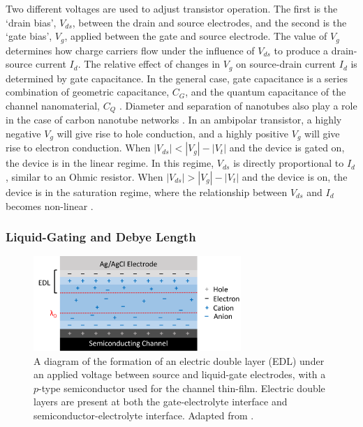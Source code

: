 \documentclass[
  a4paper,
]{scrbook}
\begin{document}
Two different voltages are used to adjust transistor operation. The
first is the `drain bias', \(V_{ds}\), between the drain and source
electrodes, and the second is the `gate bias', \(V_g\), applied between
the gate and source electrode. The value of \(V_g\) determines how
charge carriers flow under the influence of \(V_{ds}\) to produce a
drain-source current \(I_d\). The relative effect of changes in \(V_g\)
on source-drain current \(I_d\) is determined by gate capacitance. In
the general case, gate capacitance is a series combination of geometric
capacitance, \(C_{G}\), and the quantum capacitance of the channel
nanomaterial, \(C_{Q}\)
\autocite{Avouris2007,Cao2009,Heller2009a,Tran2016,Li2023}. Diameter and
separation of nanotubes also play a role in the case of carbon nanotube
networks \autocite{Rouhi2011a}. In an ambipolar transistor, a highly
negative \(V_g\) will give rise to hole conduction, and a highly
positive \(V_g\) will give rise to electron
conduction\autocite{Avouris2007,Yao2021,Li2023}. When
\(|V_{ds}| < |V_g| - |V_t|\) and the device is gated on, the device is
in the linear regime. In this regime, \(V_{ds}\) is directly
proportional to \(I_{d}\), similar to an Ohmic resistor. When
\(|V_{ds}| > |V_g| - |V_t|\) and the device is on, the device is in the
saturation regime, where the relationship between \(V_{ds}\) and
\(I_{d}\) becomes non-linear \autocite{Petti2016,Shkodra2021,Li2023}.

\hypertarget{liquid-gating-and-debye-length}{%
\subsubsection*{Liquid-Gating and Debye
Length}\label{liquid-gating-and-debye-length}}

\begin{figure}

{\centering \includegraphics[width=0.7\textwidth,height=\textheight]{figures/ch2/Debye-length-schematic-alt.png}

}

\caption{\label{fig-Debye-length}A diagram of the formation of an
electric double layer (EDL) under an applied voltage between source and
liquid-gate electrodes, with a \(p\)-type semiconductor used for the
channel thin-film. Electric double layers are present at both the
gate-electrolyte interface and semiconductor-electrolyte interface.
Adapted from \autocite{Ohno2015,Shkodra2021,Tiwari2022}.}

\end{figure}
\end{document}
